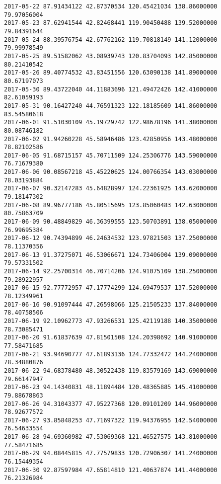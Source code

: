 \documentclass[11pt]{article}
\begin{document}
\begin{Verbatim}[commandchars=\\\{\}]
2017-05-22 87.91434122 42.87370534 120.45421034 138.86000000 79.97056004   
2017-05-23 87.62941544 42.82468441 119.90450488 139.52000000 79.84391644   
2017-05-24 88.39576754 42.67762162 119.70818149 141.12000000 79.99978549   
2017-05-25 89.51582062 43.08939743 120.83704093 142.85000000 80.21410542   
2017-05-26 89.40774532 43.83451556 120.63090138 141.89000000 80.67197073   
2017-05-30 89.43722040 44.11883696 121.49472426 142.41000000 82.61059193   
2017-05-31 90.16427240 44.76591323 122.18185609 141.86000000 83.54580618   
2017-06-01 91.51030109 45.19729742 122.98678196 141.38000000 80.08746182   
2017-06-02 91.94260228 45.58946486 123.42850956 143.48000000 78.82102586   
2017-06-05 91.68715157 45.70711509 124.25306776 143.59000000 76.71679380   
2017-06-06 90.08567218 45.45220625 124.00766354 143.03000000 78.03193884   
2017-06-07 90.32147283 45.64828997 124.22361925 143.62000000 79.18147302   
2017-06-08 89.96777186 45.80515695 123.85060483 142.63000000 80.75863709   
2017-06-09 90.48849829 46.36399555 123.50703891 138.05000000 76.99695384   
2017-06-12 90.74394899 46.24634532 123.97821503 137.25000000 78.11370356   
2017-06-13 91.37275071 46.53066671 124.73406004 139.09000000 79.57331502   
2017-06-14 92.25700314 46.70714206 124.91075109 138.25000000 79.28922957   
2017-06-15 92.77772957 47.17774299 124.69479537 137.52000000 78.12349961   
2017-06-16 90.91097444 47.26598066 125.21505233 137.84000000 78.40758506   
2017-06-19 92.10962773 47.93266531 125.42119188 140.35000000 78.73085471   
2017-06-20 91.61837639 47.81501508 124.20398692 140.91000000 77.58471685   
2017-06-21 93.94690777 47.61893136 124.77332472 144.24000000 78.34880876   
2017-06-22 94.68378480 48.30522438 119.83579169 143.69000000 79.66147947   
2017-06-23 94.14340831 48.11894484 120.48365885 145.41000000 79.88678863   
2017-06-26 94.31043377 47.95227368 120.09101209 144.96000000 78.92677572   
2017-06-27 93.85848253 47.71697322 119.94376955 142.54000000 76.54633554   
2017-06-28 94.69360982 47.53069368 121.46527575 143.81000000 77.58471685   
2017-06-29 94.08445815 47.77579833 120.72906307 141.24000000 76.15449354   
2017-06-30 92.87597984 47.65814810 121.40637874 141.44000000 76.21326984   


\end{Verbatim}
\end{document}
